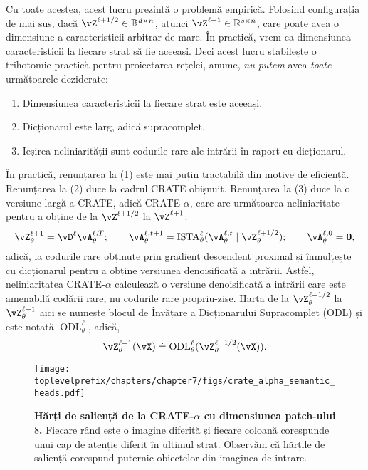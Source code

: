 \documentclass[../../book-main_ro.tex]{subfiles}
\begin{document}
Cu toate acestea, acest lucru prezintă o problemă empirică. Folosind configurația de mai sus, dacă \(\vZ^{\ell + 1/2} \in \R^{d \times n}\), atunci \(\vZ^{\ell + 1} \in \R^{s \times n}\), care poate avea o dimensiune a caracteristicii arbitrar de mare. În practică, vrem ca dimensiunea caracteristicii la fiecare strat să fie aceeași. Deci acest lucru stabilește o trihotomie practică pentru proiectarea rețelei, anume, \textit{nu putem} avea \textit{toate} următoarele deziderate:
\begin{enumerate}
    \item Dimensiunea caracteristicii la fiecare strat este aceeași.
    \item Dicționarul este larg, adică supracomplet.
    \item Ieșirea neliniarității sunt codurile rare ale intrării în raport cu dicționarul.
\end{enumerate}
În practică, renunțarea la (1) este mai puțin tractabilă din motive de eficiență. Renunțarea la (2) duce la cadrul CRATE obișnuit. Renunțarea la (3) duce la o versiune largă a CRATE, adică CRATE-\(\alpha\), care are următoarea neliniaritate pentru a obține de la \(\vZ^{\ell + 1/2}\) la \(\vZ^{\ell + 1}\):
\begin{equation}
    \vZ_{\theta}^{\ell + 1} = \vD^{\ell}\vA_{\theta}^{\ell, T}; \qquad \vA_{\theta}^{\ell, t + 1} = \ISTA_{\theta}^{\ell}(\vA_{\theta}^{\ell, t} \mid \vZ_{\theta}^{\ell + 1/2}); \qquad \vA_{\theta}^{\ell, 0} = \vzero,
\end{equation}
adică, ia codurile rare obținute prin gradient descendent proximal și înmulțește cu dicționarul pentru a obține versiunea denoisificată a intrării. Astfel, neliniaritatea CRATE-\(\alpha\) calculează o versiune denoisificată a intrării care este amenabilă codării rare, nu codurile rare propriu-zise. Harta de la \(\vZ_{\theta}^{\ell + 1/2}\) la \(\vZ_{\theta}^{\ell + 1}\) aici se numește blocul de Învățare a Dicționarului Supracomplet (ODL) și este notată \(\operatorname{ODL}_{\theta}^{\ell}\), adică,
\begin{equation}
    \vZ_{\theta}^{\ell + 1}(\vX) \doteq \operatorname{ODL}_{\theta}^{\ell}(\vZ_{\theta}^{\ell + 1/2}(\vX)).
\end{equation}



\begin{figure}[t]
    \centering 
    \texttt{[image: \\toplevelprefix/chapters/chapter7/figs/crate\_alpha\_semantic\_heads.pdf]}
    \caption{\small\textbf{Hărți de saliență de la CRATE-\(\alpha\) cu dimensiunea patch-ului \(8\).} Fiecare rând este o imagine diferită și fiecare coloană corespunde unui cap de atenție diferit în ultimul strat. Observăm că hărțile de saliență corespund puternic obiectelor din imaginea de intrare.}
    \label{fig:crate_alpha_saliency_maps}
\end{figure}
\end{document}
